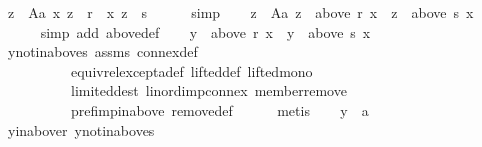 \begin{isabellebody}
\ {\isachardoublequoteopen}{\isasymforall}z\ {\isasymin}\ A{\isacharminus}{\kern0pt}{\isacharbraceleft}{\kern0pt}a{\isacharbraceright}{\kern0pt}{\isachardot}{\kern0pt}\ {\isacharparenleft}{\kern0pt}x{\isacharcomma}{\kern0pt}\ z{\isacharparenright}{\kern0pt}\ {\isasymin}\ r\ {\isasymlongleftrightarrow}\ {\isacharparenleft}{\kern0pt}x{\isacharcomma}{\kern0pt}\ z{\isacharparenright}{\kern0pt}\ {\isasymin}\ s{\isachardoublequoteclose}\isanewline
\ \ \ \ \isamarkupfalse%
\ simp\isanewline
\ \ \isamarkupfalse%
\ {\isachardoublequoteopen}{\isasymforall}z\ {\isasymin}\ A{\isacharminus}{\kern0pt}{\isacharbraceleft}{\kern0pt}a{\isacharbraceright}{\kern0pt}{\isachardot}{\kern0pt}\ z\ {\isasymin}\ above\ r\ x\ {\isasymlongleftrightarrow}\ z\ {\isasymin}\ above\ s\ x{\isachardoublequoteclose}\isanewline
\ \ \ \ \isamarkupfalse%
\ {\isacharparenleft}{\kern0pt}simp\ add{\isacharcolon}{\kern0pt}\ above{\isacharunderscore}{\kern0pt}def{\isacharparenright}{\kern0pt}\isanewline
\ \ \isamarkupfalse%
\ {\isachardoublequoteopen}y\ {\isasymin}\ above\ r\ x\ {\isasymlongleftrightarrow}\ y\ {\isasymin}\ above\ s\ x{\isachardoublequoteclose}\isanewline
\ \ \ \ \isamarkupfalse%
\ y{\isacharunderscore}{\kern0pt}not{\isacharunderscore}{\kern0pt}in{\isacharunderscore}{\kern0pt}above{\isacharunderscore}{\kern0pt}s\ assms{\isacharparenleft}{\kern0pt}{}{\isacharparenright}{\kern0pt}\ connex{\isacharunderscore}{\kern0pt}def\isanewline
\ \ \ \ \ \ \ \ \ \ equiv{\isacharunderscore}{\kern0pt}rel{\isacharunderscore}{\kern0pt}except{\isacharunderscore}{\kern0pt}a{\isacharunderscore}{\kern0pt}def\ lifted{\isacharunderscore}{\kern0pt}def\ lifted{\isacharunderscore}{\kern0pt}mono{}\isanewline
\ \ \ \ \ \ \ \ \ \ limited{\isacharunderscore}{\kern0pt}dest\ lin{\isacharunderscore}{\kern0pt}ord{\isacharunderscore}{\kern0pt}imp{\isacharunderscore}{\kern0pt}connex\ member{\isacharunderscore}{\kern0pt}remove\isanewline
\ \ \ \ \ \ \ \ \ \ pref{\isacharunderscore}{\kern0pt}imp{\isacharunderscore}{\kern0pt}in{\isacharunderscore}{\kern0pt}above\ remove{\isacharunderscore}{\kern0pt}def\isanewline
\ \ \ \ \isamarkupfalse%
\ metis\isanewline
\ \ \isamarkupfalse%
\ {\isachardoublequoteopen}y\ {\isacharequal}{\kern0pt}\ a{\isachardoublequoteclose}\isanewline
\ \ \ \ \isamarkupfalse%
\ y{\isacharunderscore}{\kern0pt}in{\isacharunderscore}{\kern0pt}above{\isacharunderscore}{\kern0pt}r\ y{\isacharunderscore}{\kern0pt}not{\isacharunderscore}{\kern0pt}in{\isacharunderscore}{\kern0pt}above{\isacharunderscore}{\kern0pt}s\isanewline

\end{isabellebody}
